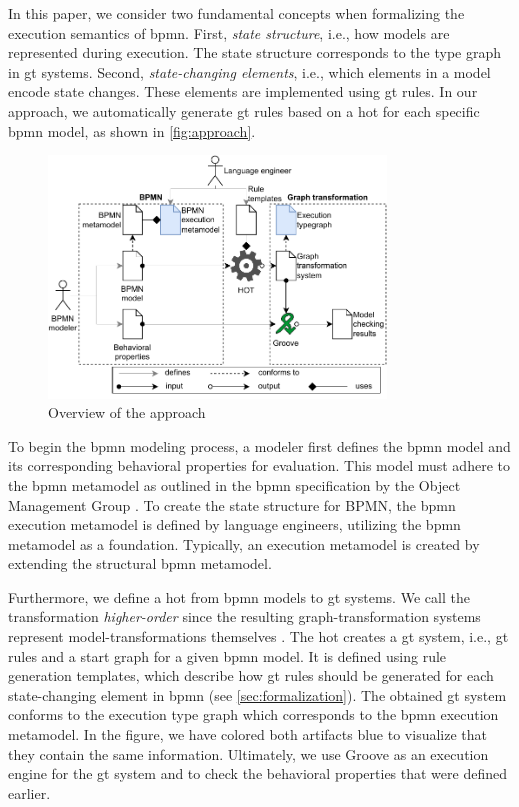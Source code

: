 \documentclass[runningheads]{llncs}
\begin{document}
In this paper, we consider two fundamental concepts when formalizing the execution semantics of \gls*{bpmn}.
First, \textit{state structure}, i.e., how models are represented during execution.
The state structure corresponds to the type graph in \gls*{gt} systems.
Second, \textit{state-changing elements}, i.e., which elements in a model encode state changes.
These elements are implemented using \gls*{gt} rules.
In our approach, we automatically generate \gls*{gt} rules based on a \gls*{hot} for each specific \gls*{bpmn} model, as shown in \autoref{fig:approach}.

\begin{figure}[ht]
    \centering
    \includegraphics[width=0.8\textwidth]{images/bpmn_semantics-overview.pdf}
    \caption{Overview of the approach}
    \label{fig:approach}
\end{figure}

To begin the \gls*{bpmn} modeling process, a modeler first defines the \gls*{bpmn} model and its corresponding behavioral properties for evaluation.
This model must adhere to the \gls*{bpmn} metamodel as outlined in the \gls*{bpmn} specification by the Object Management Group \cite{objectmanagementgroupBusinessProcessModel2013}.
To create the state structure for BPMN, the \gls*{bpmn} execution metamodel is defined by language engineers, utilizing the \gls*{bpmn} metamodel as a foundation.
Typically, an execution metamodel is created by extending the structural \gls*{bpmn} metamodel.

Furthermore, we define a \gls*{hot} from \gls*{bpmn} models to \gls*{gt} systems.
We call the transformation \textit{higher-order} since the resulting graph-transformation systems represent model-transformations themselves \cite{tisiUseHigherOrderModel2009}.
The \gls*{hot} creates a \gls*{gt} system, i.e., \gls*{gt} rules and a start graph for a given \gls*{bpmn} model.
It is defined using rule generation templates, which describe how \gls*{gt} rules should be generated for each state-changing element in \gls*{bpmn} (see \autoref{sec:formalization}).
The obtained \gls*{gt} system conforms to the execution type graph which corresponds to the \gls*{bpmn} execution metamodel.
In the figure, we have colored both artifacts blue to visualize that they contain the same information.
Ultimately, we use Groove as an execution engine for the \gls*{gt} system and to check the behavioral properties that were defined earlier.
\end{document}
